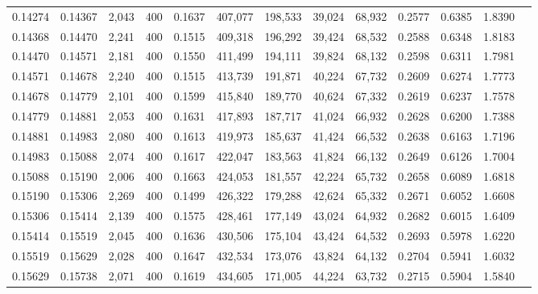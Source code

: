 \begin{tabular}{rrrrrrrrrrrrr}
0.14274 & 0.14367 &  2,043 & 400 &                                     0.1637 & 407,077 & 198,533 &  39,024 &  68,932 & 0.2577 & 0.6385 & 1.8390 \\
0.14368 & 0.14470 &  2,241 & 400 &                                     0.1515 & 409,318 & 196,292 &  39,424 &  68,532 & 0.2588 & 0.6348 & 1.8183 \\
0.14470 & 0.14571 &  2,181 & 400 &                                     0.1550 & 411,499 & 194,111 &  39,824 &  68,132 & 0.2598 & 0.6311 & 1.7981 \\
0.14571 & 0.14678 &  2,240 & 400 &                                     0.1515 & 413,739 & 191,871 &  40,224 &  67,732 & 0.2609 & 0.6274 & 1.7773 \\
0.14678 & 0.14779 &  2,101 & 400 &                                     0.1599 & 415,840 & 189,770 &  40,624 &  67,332 & 0.2619 & 0.6237 & 1.7578 \\
0.14779 & 0.14881 &  2,053 & 400 &                                     0.1631 & 417,893 & 187,717 &  41,024 &  66,932 & 0.2628 & 0.6200 & 1.7388 \\
0.14881 & 0.14983 &  2,080 & 400 &                                     0.1613 & 419,973 & 185,637 &  41,424 &  66,532 & 0.2638 & 0.6163 & 1.7196 \\
0.14983 & 0.15088 &  2,074 & 400 &                                     0.1617 & 422,047 & 183,563 &  41,824 &  66,132 & 0.2649 & 0.6126 & 1.7004 \\
0.15088 & 0.15190 &  2,006 & 400 &                                     0.1663 & 424,053 & 181,557 &  42,224 &  65,732 & 0.2658 & 0.6089 & 1.6818 \\
0.15190 & 0.15306 &  2,269 & 400 &                                     0.1499 & 426,322 & 179,288 &  42,624 &  65,332 & 0.2671 & 0.6052 & 1.6608 \\
0.15306 & 0.15414 &  2,139 & 400 &                                     0.1575 & 428,461 & 177,149 &  43,024 &  64,932 & 0.2682 & 0.6015 & 1.6409 \\
0.15414 & 0.15519 &  2,045 & 400 &                                     0.1636 & 430,506 & 175,104 &  43,424 &  64,532 & 0.2693 & 0.5978 & 1.6220 \\
0.15519 & 0.15629 &  2,028 & 400 &                                     0.1647 & 432,534 & 173,076 &  43,824 &  64,132 & 0.2704 & 0.5941 & 1.6032 \\
0.15629 & 0.15738 &  2,071 & 400 &                                     0.1619 & 434,605 & 171,005 &  44,224 &  63,732 & 0.2715 & 0.5904 & 1.5840 \\

\end{tabular}
